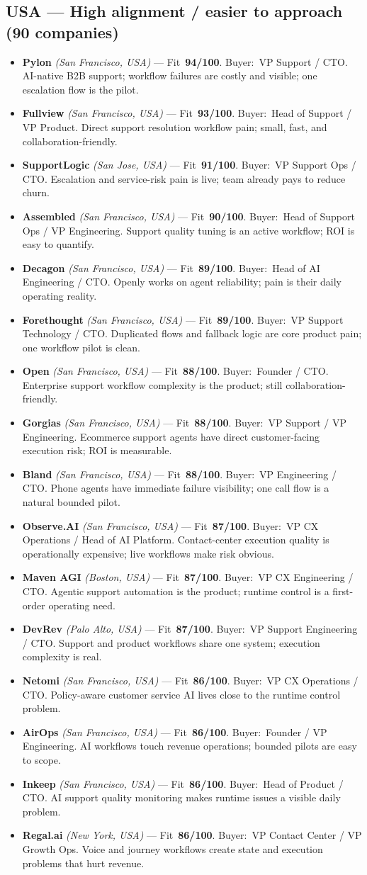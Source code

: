 \documentclass[10pt]{article}
\newcommand{\cand}[5]{\item \textbf{#1} \textit{(#2)} --- Fit~\textbf{#3/100}. Buyer:~#4. #5}
\newcommand{\topcand}[5]{\item \textcolor{green!50!black}{\textbf{#1} \textit{(#2)}} --- Fit~\textbf{#3/100}. Buyer:~#4. #5}
\begin{document}
\subsection{USA --- High alignment / easier to approach (90 companies)}
\begin{itemize}
\topcand{Pylon}{San Francisco, USA}{94}{VP Support / CTO}{AI-native B2B support; workflow failures are costly and visible; one escalation flow is the pilot.}
\topcand{Fullview}{San Francisco, USA}{93}{Head of Support / VP Product}{Direct support resolution workflow pain; small, fast, and collaboration-friendly.}
\topcand{SupportLogic}{San Jose, USA}{91}{VP Support Ops / CTO}{Escalation and service-risk pain is live; team already pays to reduce churn.}
\topcand{Assembled}{San Francisco, USA}{90}{Head of Support Ops / VP Engineering}{Support quality tuning is an active workflow; ROI is easy to quantify.}
\cand{Decagon}{San Francisco, USA}{89}{Head of AI Engineering / CTO}{Openly works on agent reliability; pain is their daily operating reality.}
\cand{Forethought}{San Francisco, USA}{89}{VP Support Technology / CTO}{Duplicated flows and fallback logic are core product pain; one workflow pilot is clean.}
\cand{Open}{San Francisco, USA}{88}{Founder / CTO}{Enterprise support workflow complexity is the product; still collaboration-friendly.}
\cand{Gorgias}{San Francisco, USA}{88}{VP Support / VP Engineering}{Ecommerce support agents have direct customer-facing execution risk; ROI is measurable.}
\cand{Bland}{San Francisco, USA}{88}{VP Engineering / CTO}{Phone agents have immediate failure visibility; one call flow is a natural bounded pilot.}
\cand{Observe.AI}{San Francisco, USA}{87}{VP CX Operations / Head of AI Platform}{Contact-center execution quality is operationally expensive; live workflows make risk obvious.}
\cand{Maven AGI}{Boston, USA}{87}{VP CX Engineering / CTO}{Agentic support automation is the product; runtime control is a first-order operating need.}
\cand{DevRev}{Palo Alto, USA}{87}{VP Support Engineering / CTO}{Support and product workflows share one system; execution complexity is real.}
\cand{Netomi}{San Francisco, USA}{86}{VP CX Operations / CTO}{Policy-aware customer service AI lives close to the runtime control problem.}
\cand{AirOps}{San Francisco, USA}{86}{Founder / VP Engineering}{AI workflows touch revenue operations; bounded pilots are easy to scope.}
\cand{Inkeep}{San Francisco, USA}{86}{Head of Product / CTO}{AI support quality monitoring makes runtime issues a visible daily problem.}
\cand{Regal.ai}{New York, USA}{86}{VP Contact Center / VP Growth Ops}{Voice and journey workflows create state and execution problems that hurt revenue.}

\end{itemize}
\end{document}
